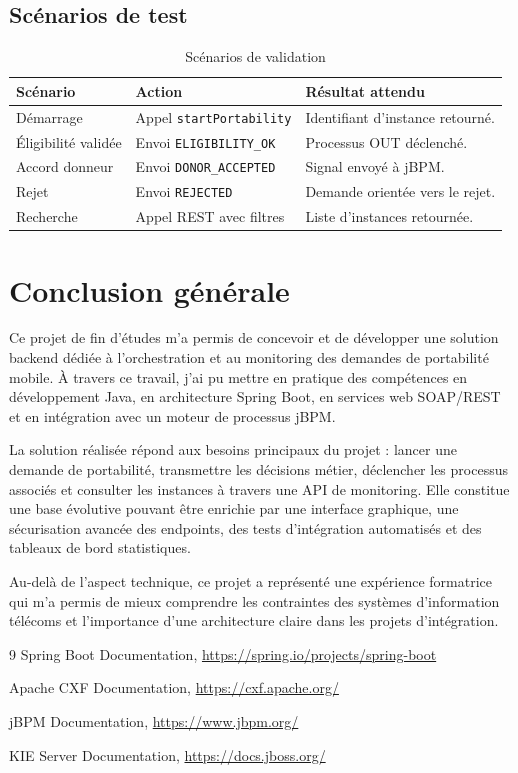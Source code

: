 \documentclass[12pt,a4paper]{report}
\begin{document}
\section{Scénarios de test}
\begin{table}[h]
    \centering
    \begin{tabular}{p{4cm}p{5cm}p{4cm}}
        \toprule
        \textbf{Scénario} & \textbf{Action} & \textbf{Résultat attendu} \\
        \midrule
        Démarrage & Appel \texttt{startPortability} & Identifiant d'instance retourné. \\
        Éligibilité validée & Envoi \texttt{ELIGIBILITY\_OK} & Processus OUT déclenché. \\
        Accord donneur & Envoi \texttt{DONOR\_ACCEPTED} & Signal envoyé à jBPM. \\
        Rejet & Envoi \texttt{REJECTED} & Demande orientée vers le rejet. \\
        Recherche & Appel REST avec filtres & Liste d'instances retournée. \\
        \bottomrule
    \end{tabular}
    \caption{Scénarios de validation}
\end{table}

\chapter*{Conclusion générale}
Ce projet de fin d'études m'a permis de concevoir et de développer une solution backend dédiée à l'orchestration et au monitoring des demandes de portabilité mobile. À travers ce travail, j'ai pu mettre en pratique des compétences en développement Java, en architecture Spring Boot, en services web SOAP/REST et en intégration avec un moteur de processus jBPM.

La solution réalisée répond aux besoins principaux du projet : lancer une demande de portabilité, transmettre les décisions métier, déclencher les processus associés et consulter les instances à travers une API de monitoring. Elle constitue une base évolutive pouvant être enrichie par une interface graphique, une sécurisation avancée des endpoints, des tests d'intégration automatisés et des tableaux de bord statistiques.

Au-delà de l'aspect technique, ce projet a représenté une expérience formatrice qui m'a permis de mieux comprendre les contraintes des systèmes d'information télécoms et l'importance d'une architecture claire dans les projets d'intégration.

\begin{thebibliography}{9}
    Spring Boot Documentation, \url{https://spring.io/projects/spring-boot}

    Apache CXF Documentation, \url{https://cxf.apache.org/}

    jBPM Documentation, \url{https://www.jbpm.org/}

    KIE Server Documentation, \url{https://docs.jboss.org/}
\end{thebibliography}
\end{document}
